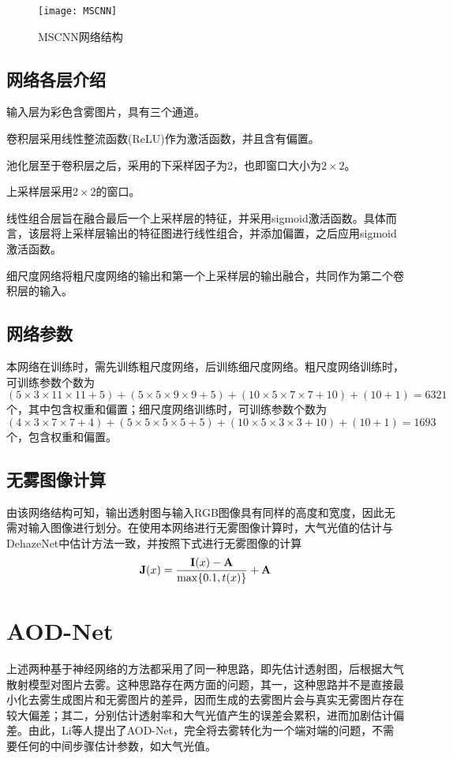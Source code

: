 \documentclass[a4paper, 12pt, oneside]{report}
\begin{document}
{\begin{figure}[H]
\centering
\texttt{[image: MSCNN]}
\caption{MSCNN网络结构}
\end{figure}

\subsection{网络各层介绍\quad}
	输入层为彩色含雾图片，具有三个通道。
\par 卷积层采用线性整流函数(ReLU)作为激活函数，并且含有偏置。
\par 池化层至于卷积层之后，采用的下采样因子为2，也即窗口大小为$2 \times 2$。
\par 上采样层采用$2 \times 2$的窗口。
\par 线性组合层旨在融合最后一个上采样层的特征，并采用sigmoid激活函数。具体而言，该层将上采样层输出的特征图进行线性组合，并添加偏置，之后应用sigmoid激活函数。
\par 细尺度网络将粗尺度网络的输出和第一个上采样层的输出融合，共同作为第二个卷积层的输入。

\subsection{网络参数\quad}
	本网络在训练时，需先训练粗尺度网络，后训练细尺度网络。粗尺度网络训练时，可训练参数个数为$(5 \times 3 \times 11 \times 11 + 5) + (5 \times 5 \times 9 \times 9 + 5) + (10 \times 5 \times 7 \times 7 + 10) + (10 + 1) = 6321$个，其中包含权重和偏置；细尺度网络训练时，可训练参数个数为$(4 \times 3 \times 7 \times 7 + 4) + (5 \times 5 \times 5 \times 5 + 5) + (10 \times 5 \times 3 \times 3 + 10) + (10 + 1) = 1693$个，包含权重和偏置。

\subsection{无雾图像计算\quad}
	由该网络结构可知，输出透射图与输入RGB图像具有同样的高度和宽度，因此无需对输入图像进行划分。在使用本网络进行无雾图像计算时，大气光值的估计与DehazeNet中估计方法一致，并按照下式进行无雾图像的计算
\begin{equation}
{\bf J}(x) = \frac{{\bf I}(x) - {\bf A}}{\max\{0.1, t(x)\}} + {\bf A}
\end{equation}

\section{AOD-Net\quad}
上述两种基于神经网络的方法都采用了同一种思路，即先估计透射图，后根据大气散射模型对图片去雾。这种思路存在两方面的问题，其一，这种思路并不是直接最小化去雾生成图片和无雾图片的差异，因而生成的去雾图片会与真实无雾图片存在较大偏差；其二，分别估计透射率和大气光值产生的误差会累积，进而加剧估计偏差。由此，Li\cite{ref18}等人提出了AOD-Net，完全将去雾转化为一个端对端的问题，不需要任何的中间步骤估计参数，如大气光值。

}
\end{document}
